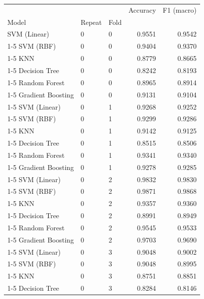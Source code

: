 \begin{table}
\label{tab:Ext06_repeated_cv_fold_scores}
\begin{tabular}{lllrr}
\toprule
 &  &  & Accuracy & F1 (macro) \\
Model & Repeat & Fold &  &  \\
\midrule
SVM (Linear) & 0 & 0 & 0.9551 & 0.9542 \\
\cline{1-5} \cline{2-5}
SVM (RBF) & 0 & 0 & 0.9404 & 0.9370 \\
\cline{1-5} \cline{2-5}
KNN & 0 & 0 & 0.8779 & 0.8665 \\
\cline{1-5} \cline{2-5}
Decision Tree & 0 & 0 & 0.8242 & 0.8193 \\
\cline{1-5} \cline{2-5}
Random Forest & 0 & 0 & 0.8965 & 0.8914 \\
\cline{1-5} \cline{2-5}
Gradient Boosting & 0 & 0 & 0.9131 & 0.9104 \\
\cline{1-5} \cline{2-5}
SVM (Linear) & 0 & 1 & 0.9268 & 0.9252 \\
\cline{1-5} \cline{2-5}
SVM (RBF) & 0 & 1 & 0.9299 & 0.9286 \\
\cline{1-5} \cline{2-5}
KNN & 0 & 1 & 0.9142 & 0.9125 \\
\cline{1-5} \cline{2-5}
Decision Tree & 0 & 1 & 0.8515 & 0.8506 \\
\cline{1-5} \cline{2-5}
Random Forest & 0 & 1 & 0.9341 & 0.9340 \\
\cline{1-5} \cline{2-5}
Gradient Boosting & 0 & 1 & 0.9278 & 0.9285 \\
\cline{1-5} \cline{2-5}
SVM (Linear) & 0 & 2 & 0.9832 & 0.9830 \\
\cline{1-5} \cline{2-5}
SVM (RBF) & 0 & 2 & 0.9871 & 0.9868 \\
\cline{1-5} \cline{2-5}
KNN & 0 & 2 & 0.9357 & 0.9360 \\
\cline{1-5} \cline{2-5}
Decision Tree & 0 & 2 & 0.8991 & 0.8949 \\
\cline{1-5} \cline{2-5}
Random Forest & 0 & 2 & 0.9545 & 0.9533 \\
\cline{1-5} \cline{2-5}
Gradient Boosting & 0 & 2 & 0.9703 & 0.9690 \\
\cline{1-5} \cline{2-5}
SVM (Linear) & 0 & 3 & 0.9048 & 0.9002 \\
\cline{1-5} \cline{2-5}
SVM (RBF) & 0 & 3 & 0.9048 & 0.8995 \\
\cline{1-5} \cline{2-5}
KNN & 0 & 3 & 0.8751 & 0.8851 \\
\cline{1-5} \cline{2-5}
Decision Tree & 0 & 3 & 0.8284 & 0.8146 \\

\end{tabular}
\end{table}
